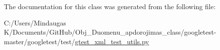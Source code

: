 The documentation for this class was generated from the following file\+:\begin{DoxyCompactItemize}
\item 
C\+:/\+Users/\+Mindaugas K/\+Documents/\+Git\+Hub/\+Obj\+\_\+\+Duomenu\+\_\+apdorojimas\+\_\+class/googletest-\/master/googletest/test/\mbox{\hyperlink{googletest-master_2googletest_2test_2gtest__xml__test__utils_8py}{gtest\+\_\+xml\+\_\+test\+\_\+utils.\+py}}\end{DoxyCompactItemize}
